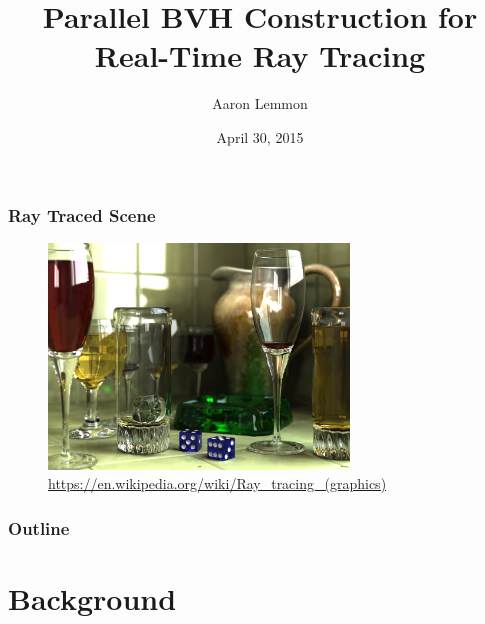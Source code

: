 \documentclass{beamer}
\begin{document}
\title{Parallel BVH Construction for Real-Time Ray Tracing}
\author{Aaron Lemmon}
\date[]  
{April 30, 2015}

\begin{frame}
  \titlepage
\end{frame}

\begin{frame}
  \frametitle{Ray Traced Scene}
\begin{figure}
\includegraphics[height=60mm]{Glasses_800_edit.png}
\hspace{6pt}\hbox{\tiny{\url{https://en.wikipedia.org/wiki/Ray_tracing_(graphics)}}}
\end{figure}



\end{frame}

\begin{frame}

  \frametitle{Outline}
\tableofcontents
\end{frame}

\section{Background}
\end{document}
